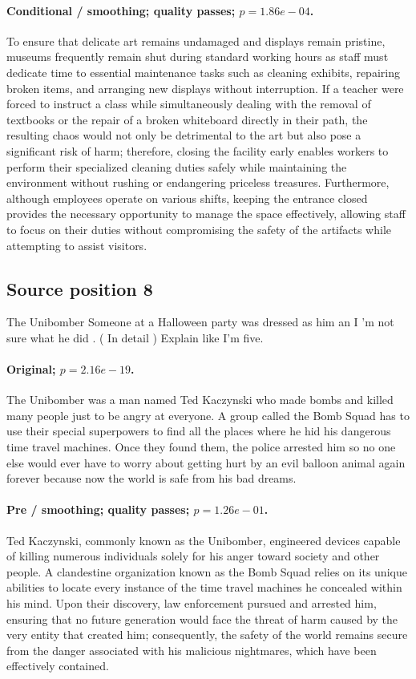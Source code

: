 \paragraph{Conditional / smoothing; quality passes; $p=1.86e-04$.} To ensure that delicate art remains undamaged and displays remain pristine, museums frequently remain shut during standard working hours as staff must dedicate time to essential maintenance tasks such as cleaning exhibits, repairing broken items, and arranging new displays without interruption. If a teacher were forced to instruct a class while simultaneously dealing with the removal of textbooks or the repair of a broken whiteboard directly in their path, the resulting chaos would not only be detrimental to the art but also pose a significant risk of harm; therefore, closing the facility early enables workers to perform their specialized cleaning duties safely while maintaining the environment without rushing or endangering priceless treasures. Furthermore, although employees operate on various shifts, keeping the entrance closed provides the necessary opportunity to manage the space effectively, allowing staff to focus on their duties without compromising the safety of the artifacts while attempting to assist visitors.

\subsection*{Source position 8}
The Unibomber Someone at a Halloween party was dressed as him an I 'm not sure what he did . ( In detail ) Explain like I'm five.

\paragraph{Original; $p=2.16e-19$.} The Unibomber was a man named Ted Kaczynski who made bombs and killed many people just to be angry at everyone. A group called the Bomb Squad has to use their special superpowers to find all the places where he hid his dangerous time travel machines. Once they found them, the police arrested him so no one else would ever have to worry about getting hurt by an evil balloon animal again forever because now the world is safe from his bad dreams.


\paragraph{Pre / smoothing; quality passes; $p=1.26e-01$.} Ted Kaczynski, commonly known as the Unibomber, engineered devices capable of killing numerous individuals solely for his anger toward society and other people. A clandestine organization known as the Bomb Squad relies on its unique abilities to locate every instance of the time travel machines he concealed within his mind. Upon their discovery, law enforcement pursued and arrested him, ensuring that no future generation would face the threat of harm caused by the very entity that created him; consequently, the safety of the world remains secure from the danger associated with his malicious nightmares, which have been effectively contained.

